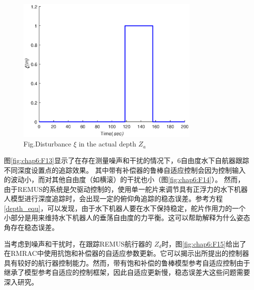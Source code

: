 \begin{figure}[!htp]%
\centering
\includegraphics[width=9cm]{figure/chap6/Fig_6_disturbance.eps}
\label{fig:chap6:F12}
 {Fig.}{Disturbance $\xi$ in the actual depth $Z_a$}
\end{figure}


图\ref {fig:chap6:F13}显示了在存在测量噪声和干扰的情况下，6自由度水下自航器跟踪不同深度设置点的追踪效果。 其中带有补偿器的鲁棒自适应控制会因为控制输入的波动小，而对其他自由度（如横滚）的干扰也小（图\ref {fig:chap6:F14}）。 然而，由于REMUS的系统是欠驱动控制的，使用单一舵片来调节具有正浮力的水下机器人模型进行深度追踪时，会出现一定的俯仰角追踪的稳态误差。参考方程\ref{depth_equ}，可以发现，由于水下机器人要在水下保持稳定，舵片作用力的一个小部分是用来维持水下机器人的垂荡自由度的力平衡。这可以帮助解释为什么姿态角存在稳态误差。

当考虑到噪声和干扰时，在跟踪REMUS航行器的 $Z_{d}$时，图\ref {fig:chap6:F15}给出了在RMRAC中使用抗饱和补偿器的自适应参数更新。它可以揭示出所提出的控制器具有较好的航行器控制能力。然而，带有饱和补偿的鲁棒模型参考自适应控制由于继承了模型参考自适应的控制框架，因此自适应更新慢，稳态误差大这些问题需要深入研究。


